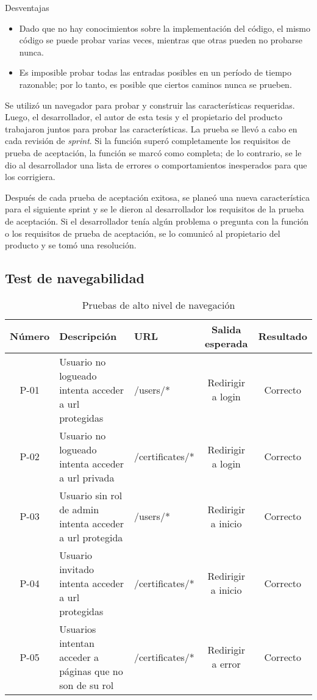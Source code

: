 Desventajas

\begin{itemize}
\item Dado que no hay conocimientos sobre la implementación del código, el mismo código se puede probar varias veces, mientras que otras pueden no probarse nunca.
\item Es imposible probar todas las entradas posibles en un período de tiempo razonable; por lo tanto, es posible que ciertos caminos nunca se prueben.
\end{itemize}

Se utilizó un navegador para probar y construir las características requeridas. Luego, el desarrollador, el autor de esta tesis y el propietario del producto trabajaron juntos para probar las características. La prueba se llevó a cabo en cada revisión de \textit{sprint}. Si la función superó completamente los requisitos de prueba de aceptación, la función se marcó como completa; de lo contrario, se le dio al desarrollador una lista de errores o comportamientos inesperados para que los corrigiera.

Después de cada prueba de aceptación exitosa, se planeó una nueva característica para el siguiente sprint y se le dieron al desarrollador los requisitos de la prueba de aceptación. Si el desarrollador tenía algún problema o pregunta con la función o los requisitos de prueba de aceptación, se lo comunicó al propietario del producto y se tomó una resolución.

\subsection{Test de navegabilidad}

\begin{table}[!h]
	\begin{center}
		\begin{tabular}{|c|p{4cm}|p{3cm}|c|c|}
		\hline \textbf{Número} & \textbf{Descripción} & \textbf{URL} & \textbf{Salida esperada} & \textbf{Resultado}\\ 
		\hline P-01 & Usuario no logueado intenta acceder a url protegidas & /users/* & Redirigir a login & Correcto\\
		\hline P-02 & Usuario no logueado intenta acceder a url privada & /certificates/* & Redirigir a login & Correcto\\
		\hline P-03 & Usuario sin rol de admin intenta acceder a url protegida & /users/* & Redirigir a inicio & Correcto\\
		\hline P-04 & Usuario invitado intenta acceder a url protegidas & /certificates/* & Redirigir a inicio & Correcto\\
		\hline P-05 & Usuarios intentan acceder a páginas que no son de su rol & /certificates/* & Redirigir a error & Correcto\\
		\hline 
		\end{tabular}
		\caption{Pruebas de alto nivel de navegación}
		\label{tab:navTest}
	\end{center}
\end{table}

